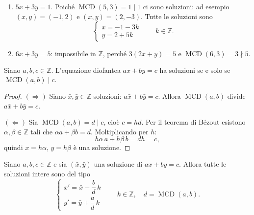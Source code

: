 \documentclass[11pt,a4paper]{article}
\begin{document}
\begin{esempio}
\begin{enumerate}
  \item $5x + 3y = 1$. Poiché $\operatorname{MCD}(5, 3) = 1 \mid 1$ ci sono soluzioni: ad esempio $(x, y) = (-1, 2)$ e $(x, y) = (2, -3)$. Tutte le soluzioni sono
  \[
    \begin{cases} x = -1 - 3k \\ y = 2 + 5k \end{cases} \qquad k \in \mathbb{Z}.
  \]
  \item $6x + 3y = 5$: impossibile in $\mathbb{Z}$, perché $3(2x + y) = 5$ e $\operatorname{MCD}(6, 3) = 3 \nmid 5$.
\end{enumerate}
\end{esempio}

\begin{proposizione}
Siano $a, b, c \in \mathbb{Z}$. L'equazione diofantea $ax + by = c$ ha soluzioni se e solo se $\operatorname{MCD}(a, b) \mid c$.
\end{proposizione}

\begin{proof}
$(\Rightarrow)$ Siano $\bar{x}, \bar{y} \in \mathbb{Z}$ soluzioni: $a\bar{x} + b\bar{y} = c$. Allora $\operatorname{MCD}(a, b)$ divide $a\bar{x} + b\bar{y} = c$.

$(\Leftarrow)$ Sia $\operatorname{MCD}(a, b) = d \mid c$, cioè $c = hd$. Per il teorema di Bézout esistono $\alpha, \beta \in \mathbb{Z}$ tali che $\alpha a + \beta b = d$. Moltiplicando per $h$:
\[
  h\alpha\, a + h\beta\, b = dh = c,
\]
quindi $x = h\alpha$, $y = h\beta$ è una soluzione. \qedhere
\end{proof}

\begin{proposizione}
Siano $a, b, c \in \mathbb{Z}$ e sia $(\bar{x}, \bar{y})$ una soluzione di $ax + by = c$. Allora tutte le soluzioni intere sono del tipo
\[
  \begin{cases} x' = \bar{x} - \dfrac{b}{d}\,k \\[2mm] y' = \bar{y} + \dfrac{a}{d}\,k \end{cases} \qquad k \in \mathbb{Z}, \quad d = \operatorname{MCD}(a, b).
\]
\end{proposizione}
\end{document}
